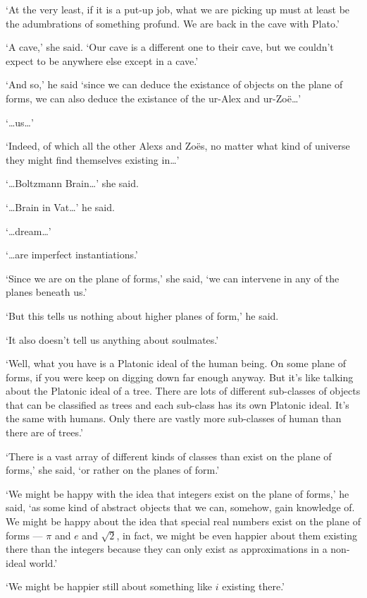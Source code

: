 `At the very least, if it is a put-up job, what we are picking up must at least be the adumbrations of something profund. We are back in the cave with Plato.'

`{\twelveit A\/} cave,' she said. `Our cave is a different one to their cave, but we couldn't expect to be anywhere else except in a cave.'

`And so,' he said `since we can deduce the existance of objects on the plane of forms, we can also deduce the existance of the ur-Alex and ur-Zoë\dots'

`{\dots}us{\dots}'

`Indeed, of which all the other Alexs and Zoës, no matter what kind of universe they might find themselves existing in\dots'

`{\dots}Boltzmann Brain{\dots}' she said.

`{\dots}Brain in Vat{\dots}' he said.

`{\dots}dream{\dots}'

`{\dots}are imperfect instantiations.'

`Since we are on the plane of forms,' she said, `we can intervene in any of the planes beneath us.'

`But this tells us nothing about higher planes of form,' he said.

`It also doesn't tell us anything about soulmates.'

`Well, what you have is a Platonic ideal of the human being. On some plane of forms, if you were keep on digging down far enough anyway. But it's like talking about the Platonic ideal of a tree. There are lots of different sub-classes of objects that can be classified as trees and each sub-class has its own Platonic ideal. It's the same with humans. Only there are vastly more sub-classes of human than there are of trees.'

`There is a vast array of different kinds of classes than exist on the plane of forms,' she said, `or rather on the {\twelveit planes\/} of form.'

`We might be happy with the idea that integers exist on the plane of forms,' he said, `as some kind of abstract objects that we can, somehow, gain knowledge of. We might be happy about the idea that special real numbers exist on the plane of forms --- $\pi$ and $e$ and $\sqrt{2}$, in fact, we might be even happier about them existing there than the integers because they can only exist as approximations in a non-ideal world.'

`We might be happier still about something like $i$ existing there.'

